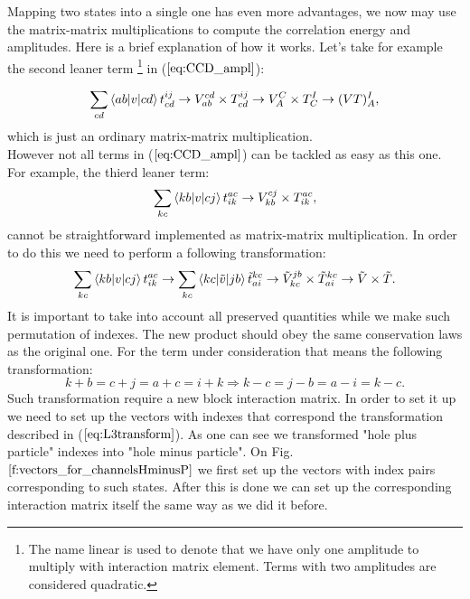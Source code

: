 \documentclass[twoside,english]{uiofysmaster}
\theoremstyle{definition}
\begin{document}
Mapping two states into a single one has even more advantages, we now may use the matrix-matrix multiplications to compute the correlation energy and amplitudes. Here is a brief explanation  of how it works. Let's take for example the second leaner term \footnote{The name linear is used to denote that we have only one amplitude to multiply with interaction matrix element. Terms with two amplitudes are considered quadratic.} in ($\ref{eq:CCD_ampl}$):

\begin{equation}
\sum_{cd}\braket{ab|v|cd}t_{cd}^{ij} \rightarrow V_{ab}^{cd} \times T_{cd}^{ij} \rightarrow V_{A}^{C} \times T_{C}^{I} \rightarrow (VT)_{A}^{I},
\end{equation}
which is just an ordinary matrix-matrix multiplication.\\
However not all terms in  ($\ref{eq:CCD_ampl}$) can be tackled as easy as this one. For example, the thierd leaner term:
\begin{align}
\sum_{kc}\braket{kb|v|cj}t_{ik}^{ac} \rightarrow V_{kb}^{cj} \times T_{ik}^{ac},
\end{align}
cannot be straightforward implemented as matrix-matrix multiplication. In order to do this we need to perform a following transformation:
\begin{align}
\sum_{kc}\braket{kb|v|cj}t_{ik}^{ac} \rightarrow \sum_{kc}\braket{kc|\tilde{v}|jb}\tilde{t}_{ai}^{kc} \rightarrow \tilde{V}_{kc}^{jb}\times \tilde{T}_{ai}^{kc} \rightarrow \tilde{V}\times\tilde{T}.
\end{align}
It is important to take into account all preserved quantities while we make such permutation of indexes. The new product should obey the same conservation laws as the original one. For the term under consideration that means the following transformation:
\begin{equation}\label{eq:L3transform}
k+b=c+j=a+c=i+k \Rightarrow k-c=j -b=a-i=k-c.
\end{equation}
Such transformation require a new block interaction matrix. In order to set it up we need to set up the vectors with indexes that correspond the transformation described in ($\ref{eq:L3transform}$). As one can see we transformed "hole plus particle" indexes into "hole minus particle". On Fig. $\ref{f:vectors_for_channelsHminusP}$ we first set up the vectors with index pairs corresponding to such states. After this is done we can set up the corresponding interaction matrix itself the same way as we did it before. 
\end{document}
